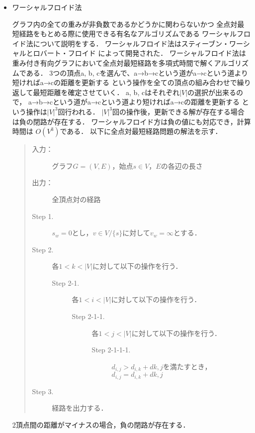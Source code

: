\documentclass[12pt]{optlab-bachelor}
\begin{document}
\begin{itemize}
  \item ワーシャルフロイド法

  グラフ内の全ての重みが非負数であるかどうかに関わらないかつ
  全点対最短経路をもとめる際に使用できる有名なアルゴリズムである
  ワーシャルフロイド法について説明をする．
  ワーシャルフロイド法はスティーブン・ワーシャルとロバート・フロイド \cite{Floyd}によって開発された．
  ワーシャルフロイド法は重み付き有向グラフにおいて全点対最短経路を多項式時間で解くアルゴリズムである．
  3つの頂点a, b, cを選んで、a→b→cという道がa→cという道より短ければa→cの距離を更新する
  という操作を全ての頂点の組み合わせで繰り返して最短距離を確定させていく．
  a, b, cはそれぞれ$|V|$の選択が出来るので，
  a→b→cという道がa→cという道より短ければa→cの距離を更新する
  という操作は$|V|^3$回行われる．
  $|V|^3$回の操作後，更新できる解が存在する場合は負の閉路が存在する．
  ワーシャルフロイド方は負の値にも対応でき，計算時間は $O(V^3)$である．
  以下に全点対最短経路問題の解法を示す．

  \begin{quote}
    \begin{description}
      \item[入力：] グラフ$G=(V,E)$，始点$s \in V$，$E$の各辺の長さ
      \item[出力：] 全頂点対の経路
      \item[Step 1.] $s_w = 0$とし，$v \in V/\{s\}$に対して$v_w = \infty$とする．
      \item[Step 2.] 各$1<k<|V|$に対して以下の操作を行う．
      \begin{description}
        \item[Step 2-1.] 各$1<i<|V|$に対して以下の操作を行う．
        \begin{description}
          \item[Step 2-1-1.] 各$1<j<|V|$に対して以下の操作を行う．
          \begin{description}
            \item[Step 2-1-1-1.] $d_{i,j} > d_{i,k} + d{k,j}$を満たすとき，
            $d_{i,j} = d_{i,k} + d{k,j}$
          \end{description}
        \end{description}
      \end{description}

      \item[Step 3.] 経路を出力する．
    \end{description}
  \end{quote}
  2頂点間の距離がマイナスの場合，負の閉路が存在する．
\end{itemize}
\end{document}
